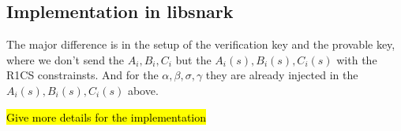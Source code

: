 \subsection{Implementation in libsnark}
The major difference is in the setup of the verification key and the provable key, where we don't send the $A_i,B_i,C_i$ but the $A_i(s),B_i(s),C_i(s)$ with the R1CS constrainsts. And for the $\alpha, \beta, \sigma,\gamma$ they are already injected in the $A_i(s),B_i(s),C_i(s)$ above.

\hl{Give more details for the implementation}